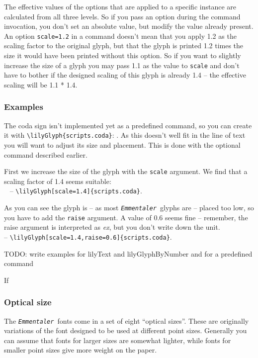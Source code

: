 \documentclass{article}
\newcommand*{\emmentaler}{\texttt{\textit{Emmentaler }}}
\newcommand*{\cmd}[1]{\texttt{\textbackslash #1}}
\begin{document}
The effective values of the options that are applied to a specific instance are calculated from all three levels. 
So if you pass an option during the command invocation, you don't set an absolute value, but modify the value already present. 
An option \texttt{scale=1.2} in a command doesn't mean that you apply 1.2 as the scaling factor to the original glyph, but that the glyph is printed 1.2 times the size it would have been printed without this option.
So if you want to slightly increase the size of a glyph you may pass 1.1 as the value to \texttt{scale} and don't have to bother if the designed scaling of this glyph is already 1.4 -- the effective scaling will be 1.1 * 1.4.

\subsubsection{Examples}
The coda sign isn't implemented yet as a predefined command, so you can create it with \cmd{lilyGlyph\{scripts.coda\}}: . 
As this doesn't well fit in the line of text you will want to adjust its size and placement.
This is done with the optional command described earlier.

First we increase the size of the glyph with the \texttt{scale} argument. We find that a scaling factor of 1.4 seems suitable:\\
~ -- \cmd{lilyGlyph[scale=1.4]\{scripts.coda\}}.

As you can see the glyph is -- as most \emmentaler glyphs are -- placed too low, so you have to add the \texttt{raise} argument. A value of 0.6 seems fine -- remember, the raise argument is interpreted as \emph{ex}, but you don't write down the unit.\\
 -- \cmd{lilyGlyph[scale=1.4,raise=0.6]\{scripts.coda\}}.

{
\color{red}

\noindent TODO: write examples for lilyText and lilyGlyphByNumber and for a predefined command
}

\bigskip
If

\subsubsection{Optical size}
The \emmentaler fonts come in a set of eight \enquote{optical sizes}.
These are originally variations of the font designed to be used at different point sizes.
Generally you can assume that fonts for larger sizes are somewhat lighter, while fonts for smaller point sizes give more weight on the paper.
\end{document}
